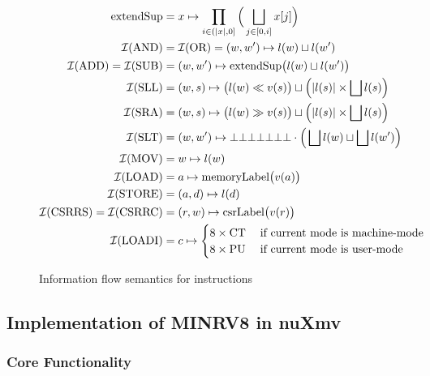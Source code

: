 \begin{figure}
    \begin{align*}
        \text{extendSup} &= x \mapsto \prod_{i \in (|x|, 0]} \Big( \bigsqcup_{j \in [0, i]} x[j] \Big) \\
        \mathcal{I}(\text{AND}) &= \mathcal{I}(\text{OR}) = (w, w') \mapsto l(w) \sqcup l(w') \\
        \mathcal{I}(\text{ADD}) = \mathcal{I}(\text{SUB}) &= (w, w') \mapsto \text{extendSup}\big(l(w) \sqcup l(w') \big) \\
        \mathcal{I}(\text{SLL}) &= (w, s) \mapsto \big(l(w) \ll v(s) \big) \sqcup \Big(|l(s)| \times \bigsqcup l(s) \Big) \\
        \mathcal{I}(\text{SRA}) &= (w, s) \mapsto \big(l(w) \gg v(s) \big) \sqcup \Big(|l(s)| \times \bigsqcup l(s) \Big) \\
        \mathcal{I}(\text{SLT}) &= (w, w') \mapsto \bot\bot\bot\bot\bot\bot\bot \cdot \Big(\bigsqcup l(w) \sqcup \bigsqcup l(w') \Big) \\
        \mathcal{I}(\text{MOV}) &= w \mapsto l(w) \\
        \mathcal{I}(\text{LOAD}) &= a \mapsto \text{memoryLabel}\big(v(a) \big) \\
        \mathcal{I}(\text{STORE}) &= (a, d) \mapsto l(d) \\
        \mathcal{I}(\text{CSRRS}) = \mathcal{I}(\text{CSRRC}) &= (r, w) \mapsto \text{csrLabel}\big(v(r) \big) \\
        \mathcal{I}(\text{LOADI}) &= c \mapsto \begin{cases}
            8 \times \text{CT} & \; \text{if current mode is machine-mode} \\
            8 \times \text{PU} & \; \text{if current mode is user-mode}
        \end{cases}
    \end{align*}
    \caption{Information flow semantics for instructions}
    \label{fig:ifc-semantics}
\end{figure}

\subsection{Implementation of MINRV8 in nuXmv}
\label{sec:model-implementation}


\subsubsection{Core Functionality}


